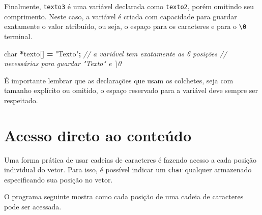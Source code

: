 \documentclass[
  11pt,
  a4paper,
]{scrbook}
\newenvironment{Shaded}{\begin{snugshade}}{\end{snugshade}}
\newcommand{\CommentTok}[1]{\textcolor[rgb]{0.56,0.35,0.01}{\textit{#1}}}
\newcommand{\DataTypeTok}[1]{\textcolor[rgb]{0.13,0.29,0.53}{#1}}
\newcommand{\NormalTok}[1]{#1}
\newcommand{\OperatorTok}[1]{\textcolor[rgb]{0.81,0.36,0.00}{\textbf{#1}}}
\newcommand{\StringTok}[1]{\textcolor[rgb]{0.31,0.60,0.02}{#1}}
\begin{document}
Finalmente, \texttt{texto3} é uma variável declarada como
\texttt{texto2}, porém omitindo seu comprimento. Neste caso, a variável
é criada com capacidade para guardar exatamente o valor atribuído, ou
seja, o espaço para os caracteres e para o \texttt{\textbackslash{}0}
terminal.

\begin{Shaded}
\begin{Highlighting}[]
\DataTypeTok{char} \OperatorTok{*}\NormalTok{texto}\OperatorTok{[]} \OperatorTok{=} \StringTok{"Texto"}\OperatorTok{;}  \CommentTok{// a variável tem exatamente as 6 posições}
                          \CommentTok{// necessárias para guardar "Texto" e \textbackslash{}0}
\end{Highlighting}
\end{Shaded}

É importante lembrar que as declarações que usam os colchetes, seja com
tamanho explícito ou omitido, o espaço reservado para a variável deve
sempre ser respeitado.

\section{Acesso direto ao conteúdo}\label{acesso-direto-ao-conteuxfado}

Uma forma prática de usar cadeias de caracteres é fazendo acesso a cada
posição individual do vetor. Para isso, é possível indicar um
\texttt{char} qualquer armazenado especificando sua posição no vetor.

O programa seguinte mostra como cada posição de uma cadeia de caracteres
pode ser acessada.
\end{document}
